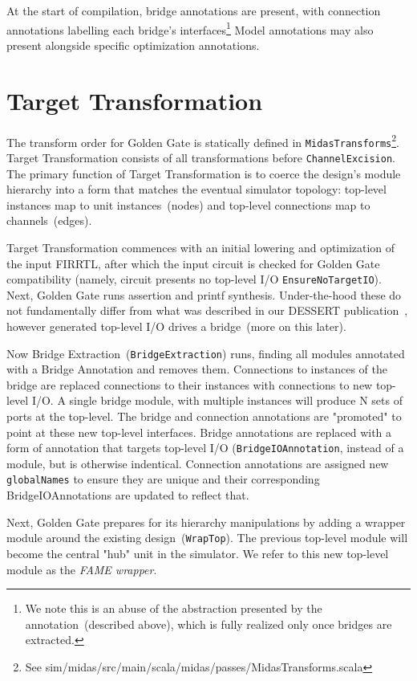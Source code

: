 At the start of compilation, bridge annotations are present, with connection
annotations labelling each bridge's interfaces\footnote{We note this is an abuse of the
abstraction presented by the annotation~(described above), which is fully realized only once bridges are extracted.}
Model annotations may also present alongside specific optimization annotations.

\section{Target Transformation}
The transform order for Golden Gate is statically defined in
\texttt{MidasTransforms}\footnote{See sim/midas/src/main/scala/midas/passes/MidasTransforms.scala}.
Target Transformation consists of all transformations before \texttt{ChannelExcision}.
The primary function of Target Transformation is to coerce the design's module
hierarchy into a form that matches the eventual simulator topology: top-level
instances map to unit instances~(nodes) and top-level connections map to
channels~(edges).

Target Transformation commences with an initial lowering and optimization of the input FIRRTL, after which
the input circuit is checked for Golden Gate compatibility (namely, circuit
presents no top-level I/O \texttt{EnsureNoTargetIO}). Next, Golden Gate
runs assertion and printf synthesis. Under-the-hood these do not fundamentally differ
from what was described in our DESSERT publication~\cite{DESSERT}, however
generated top-level I/O drives a bridge~(more on this later).

Now Bridge Extraction~(\texttt{BridgeExtraction}) runs, finding all modules
annotated with a Bridge Annotation and removes them. Connections to instances of
the bridge are replaced connections to their instances with connections to new
top-level I/O. A single bridge module, with multiple instances will produce N
sets of ports at the top-level. The bridge and connection annotations are
"promoted" to point at these new top-level interfaces. Bridge annotations are
replaced with a form of annotation that targets top-level I/O
(\texttt{BridgeIOAnnotation}, instead of a module, but is otherwise indentical.
Connection annotations are assigned new \texttt{globalNames} to ensure they
are unique and their corresponding BridgeIOAnnotations are updated to reflect
that.

Next, Golden Gate prepares for its hierarchy manipulations by adding a wrapper
module around the existing design~(\texttt{WrapTop}). The previous top-level
module will become the central "hub" unit in the simulator. We refer to this
new top-level module as the \emph{FAME wrapper}.

